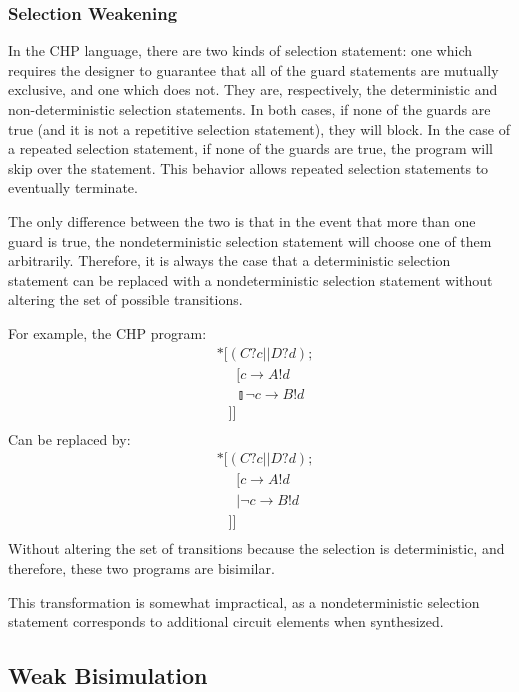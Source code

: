 \documentclass[times, 10pt]{article}
\begin{document}
\subsubsection{Selection Weakening}

In the CHP language, there are two kinds of selection statement: one which
requires the designer to guarantee that all of the guard statements are
mutually exclusive, and one which does not. They are, respectively, the
deterministic and non-deterministic selection statements. In both cases, if
none of the guards are true (and it is not a repetitive selection statement),
they will block. In the case of a repeated selection statement, if none of the
guards are true, the program will skip over the statement. This behavior
allows repeated selection statements to eventually terminate.

The only difference between the two is that in the event that more than one
guard is true, the nondeterministic selection statement will choose one of them
arbitrarily.  Therefore, it is always the case that a deterministic selection
statement can be replaced with a nondeterministic selection statement without
altering the set of possible transitions.

For example, the CHP program:
\begin{align*}
&*[(C?c || D?d); \\
& \;\;\;\;\;[ c \rightarrow A!d \\
& \;\;\;\;\;\talloblong \lnot c \rightarrow B!d \\
& \;\;\;]] \\
\end{align*}
Can be replaced by:
\begin{align*}
&*[(C?c || D?d); \\
& \;\;\;\;\;[ c \rightarrow A!d \\
& \;\;\;\;\;| \lnot c \rightarrow B!d \\
& \;\;\;]] \\
\end{align*}
Without altering the set of transitions because the selection is deterministic,
and therefore, these two programs are bisimilar.

This transformation is somewhat impractical, as a nondeterministic selection
statement corresponds to additional circuit elements when synthesized.

\subsection{Weak Bisimulation}
\end{document}
